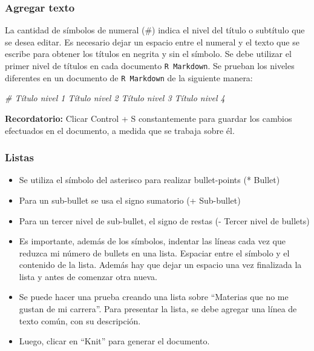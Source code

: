 \documentclass[
]{article}
\newenvironment{Shaded}{\begin{snugshade}}{\end{snugshade}}
\newcommand{\CommentTok}[1]{\textcolor[rgb]{0.56,0.35,0.01}{\textit{#1}}}
\begin{document}
\hypertarget{agregar-texto}{%
\subsubsection{Agregar texto}\label{agregar-texto}}

La cantidad de símbolos de numeral (\#) indica el nivel del título o subtítulo que se desea editar. Es necesario dejar un espacio entre el numeral y el texto que se escribe para obtener los títulos en negrita y sin el símbolo. Se debe utilizar el primer nivel de títulos en cada documento \texttt{R\ Markdown}. Se prueban los niveles diferentes en un documento de \texttt{R\ Markdown} de la siguiente manera:

\begin{Shaded}
\begin{Highlighting}[]
\CommentTok{\# Título nivel 1 Título nivel 2 Título nivel 3 Título nivel 4}
\end{Highlighting}
\end{Shaded}

\textbf{Recordatorio: } Clicar Control + S constantemente para guardar los cambios efectuados en el documento, a medida que se trabaja sobre él.

\hypertarget{listas}{%
\subsubsection{Listas}\label{listas}}

\begin{itemize}
\item
  Se utiliza el símbolo del asterisco para realizar bullet-points (* Bullet)
\item
  Para un sub-bullet se usa el signo sumatorio (+ Sub-bullet)
\item
  Para un tercer nivel de sub-bullet, el signo de restas (- Tercer nivel de bullets)
\item
  Es importante, además de los símbolos, indentar las líneas cada vez que reduzca mi número de bullets
  en una lista. Espaciar entre el símbolo y el contenido de la lista. Además hay que dejar un espacio una vez finalizada la lista y antes de comenzar otra nueva.
\item
  Se puede hacer una prueba creando una lista sobre ``Materias que no me gustan de mi carrera''. Para presentar la lista, se debe agregar una línea de texto común, con su descripción.
\item
  Luego, clicar en ``Knit'' para generar el documento.
\end{itemize}
\end{document}
